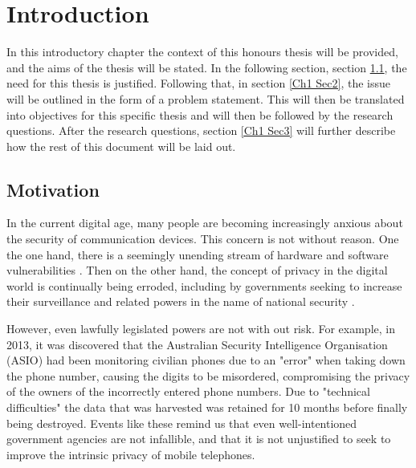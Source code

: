 
\chapter{Introduction} %

\label{Chapter 1} %

In this introductory chapter the context of this honours thesis will be provided, and the aims of the thesis will be stated.
In the following section, section \ref{Ch1 Sec1}, the need for this thesis is justified.
Following that, in section \ref{Ch1 Sec2}, the issue will be outlined in the form of a problem statement.
This will then be translated into objectives for this specific thesis and will then be followed by the research questions.
After the research questions, section \ref{Ch1 Sec3} will further describe how the rest of this document will be laid out.   


\section{Motivation}

\label{Ch1 Sec1}

In the current digital age, many people are becoming increasingly anxious about the security of communication devices.
This concern is not without reason. One the one hand, there is a seemingly unending stream of hardware and software vulnerabilities .
Then on the other hand, the concept of privacy in the digital world is continually being erroded, including by governments seeking to increase their surveillance and related powers in the name of national security .

However, even lawfully legislated powers are not with out risk.  For example, in 2013, it was discovered that the Australian Security Intelligence Organisation (ASIO) had been monitoring civilian phones due to an "error" when taking down the phone number, causing the digits to be misordered, compromising the privacy of the owners of the incorrectly entered phone numbers.
Due to "technical difficulties" the data that was harvested was retained for 10 months before finally being destroyed.\cite{Reference36}
Events like these remind us that even well-intentioned government agencies are not infallible, and that it is not unjustified to seek to improve the intrinsic privacy of mobile telephones.

